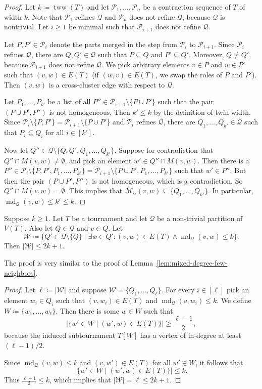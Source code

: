 \documentclass{theoretics}
\newcommand{\CM}{{\mathcal M}}
\newcommand{\CP}{{\mathcal P}}
\newcommand{\CQ}{{\mathcal Q}}
\newcommand{\CW}{{\mathcal W}}
\DeclareMathOperator{\md}{md}
\DeclareMathOperator{\tww}{tww}
\begin{document}
\begin{proof}
 Let $k \coloneqq \tww(T)$ and let $\CP_1,\dots,\CP_n$ be a contraction sequence of $T$ of width $k$.
 Note that $\CP_1$ refines $\CQ$ and $\CP_n$ does not refine $\CQ$, because $\CQ$ is nontrivial.
 Let $i \geq 1$ be minimal such that $\CP_{i+1}$ does not refine $\CQ$.

 Let $P,P' \in\CP_i$ denote the parts merged in the step from $\CP_i$ to $\CP_{i+1}$.
 Since $\CP_i$ refines $\CQ$, there are $Q,Q' \in \CQ$ such that $P \subseteq Q$ and $P'\subseteq Q'$.
 Moreover, $Q \neq Q'$, because $\CP_{i+1}$ does not refine $\CQ$.
 We pick arbitrary elements $v \in P$ and $w \in P'$ such that $(v,w) \in E(T)$ (if $(w,v)\in E(T)$, we swap the roles of $P$ and $P'$).
 Then $(v,w)$ is a cross-cluster edge with respect to $\CQ$.

 Let $P_1,\dots,P_{k'}$ be a list of all $P'' \in \CP_{i+1} \setminus \{P\cup P'\}$ such that the pair $(P\cup P',P'')$ is not homogeneous.
 Then $k' \leq k$ by the definition of twin width.
 Since $\CP_i \setminus \{P,P'\} = \CP_{i+1} \setminus \{P\cup P'\}$ and $\CP_i$ refines $\CQ$, there are $Q_1,\dots,Q_{k'} \in \CQ$ such that $P_i \subseteq Q_i$ for all $i \in [k']$.

 Now let $Q'' \in \CQ \setminus \{Q,Q',Q_1,\dots,Q_{k'}\}$.
 Suppose for contradiction that $Q'' \cap M(v,w) \neq \emptyset$, and pick an element $w' \in Q'' \cap M(v,w)$.
 Then there is a $P'' \in \CP_i \setminus \{P,P',P_1,\dots,P_{k'}\} = \CP_{i+1} \setminus \{P\cup P',P_1,\dots,P_{k'}\}$ such that $w' \in P''$.
 But then the pair $(P\cup P',P'')$ is not homogeneous, which is a contradiction.
 So $Q'' \cap M(v,w) = \emptyset$.
 This implies that $\CM_\CQ(v,w) \subseteq \{Q_1,\dots,Q_{k'}\}$.
 In particular, $\md_\CQ(v,w) \leq k' \leq k$.
\end{proof}

\begin{lemma}
 \label{lem:mixed-degree-few-neighbors-partition}
 Suppose $k \geq 1$.
 Let $T$ be a tournament and let $\CQ$ be a non-trivial partition of $V(T)$.
 Also let $Q \in \CQ$ and $v \in Q$.
 Let
 \[\CW \coloneqq \{Q' \in \CQ \setminus \{Q\} \mid \exists w \in Q'\colon (v,w) \in E(T) \wedge \md_\CQ(v,w) \leq k\}.\]
 Then $|\CW| \leq 2k + 1$.
\end{lemma}

The proof is very similar to the proof of Lemma~\ref{lem:mixed-degree-few-neighbors}.

\begin{proof}
 Let $\ell \coloneqq |\CW|$ and suppose $\CW=\{Q_1,\dots,Q_\ell\}$.
 For every $i \in [\ell]$ pick an element $w_i \in Q_i$ such that $(v,w_i) \in E(T)$ and $\md_\CQ(v,w_i) \leq k$.
 We define $W \coloneqq \{w_1,\dots,w_\ell\}$.
 Then there is some $w \in W$ such that
 \[|\{w' \in W \mid (w',w) \in E(T)\}| \geq \frac{\ell - 1}{2},\]
 because the induced subtournament $T[W]$ has a vertex of in-degree at least $(\ell-1)/2$.

 Since $\md_\CQ(v,w) \leq k$ and $(v,w') \in E(T)$ for all $w' \in W$, it follows that
 \[|\{w' \in W \mid (w',w) \in E(T)\}| \leq k.\]
 Thus $\frac{\ell - 1}{2} \leq k$, which implies that $|\CW| = \ell \leq 2k + 1$.
\end{proof}
\end{document}
